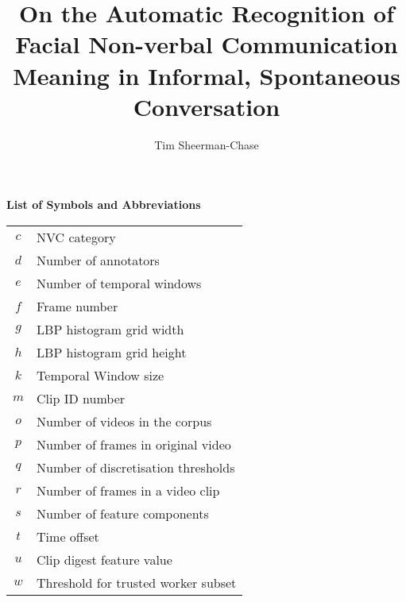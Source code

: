\documentclass[11pt]{book}  %
\title{On the Automatic Recognition of Facial Non-verbal Communication Meaning in Informal, Spontaneous Conversation}
\author{Tim Sheerman-Chase} \centre{Centre for Vision, Speech and Signal Processing}
\def\nvcCategory{c} %
\def\numAnnotators{d} %
\def\numTemporalWindows{e}
\def\frameNum{f}
\def\lbpgridwidth{g} %
\def\lbpgridheight{h} %
\def\temporalWindowSize{k}
\def\clipId{m} %
\def\numClips{o} %
\def\numSeqFrames{p} %
\def\numThresholds{q}
\def\numClipFrames{r}
\def\numFeatures{s}
\def\timeOffset{t}
\def\clipFeatureDigestVal{u} %
\def\trustedThreshold{w}
\begin{document}
\frontmatter
\makefront 

\tableofcontents  %

\small
\listoffigures

\listoftables
\normalsize

\newpage
\huge 
\textbf{List of Symbols and Abbreviations}
\normalsize

\begin{center}
\begin{tabular*}{0.75\textwidth}{  c | l  }

$\nvcCategory$		& \acf{NVC} category \\
$\numAnnotators$	& Number of annotators \\
$\numTemporalWindows$	& Number of temporal windows \\
$\frameNum$		& Frame number  \\
$\lbpgridwidth$		& \ac{LBP} histogram grid width \\
$\lbpgridheight$	& \ac{LBP} histogram grid height \\
$\temporalWindowSize$	& Temporal Window size \\
$\clipId$		& Clip ID number \\
$\numClips$		& Number of videos in the corpus \\
$\numSeqFrames$		& Number of frames in original video\\
$\numThresholds$	& Number of discretisation thresholds \\
$\numClipFrames$	& Number of frames in a video clip \\
$\numFeatures$		& Number of feature components\\
$\timeOffset$		& Time offset \\
$\clipFeatureDigestVal$	& Clip digest feature value\\
$\trustedThreshold$	& Threshold for trusted worker subset \\
\end{tabular*}


\end{center}
\end{document}
